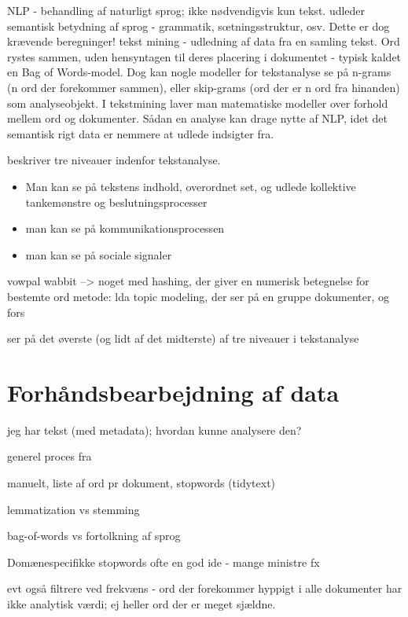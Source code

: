 NLP - behandling af naturligt sprog;  ikke nødvendigvis kun tekst. udleder semantisk betydning af sprog - grammatik, sœtningsstruktur, osv. Dette er dog krævende beregninger!
tekst mining - udledning af data fra en samling tekst. Ord rystes sammen, uden hensyntagen til deres placering i dokumentet - typisk kaldet en Bag of Words-model. Dog kan nogle modeller for tekstanalyse se på n-grams (n ord der forekommer sammen), eller skip-grams (ord der er n ord fra hinanden) som analyseobjekt. 
I tekstmining laver man matematiske modeller over forhold mellem ord og dokumenter.
Sådan en analyse kan drage nytte af NLP, idet det semantisk rigt data er nemmere at udlede indsigter fra.

\citeauthor{evansMachineTranslationMining2016} beskriver tre niveauer indenfor tekstanalyse.
\begin{itemize}
  \item
    Man kan se på tekstens indhold, overordnet set, og udlede kollektive tankemønstre og beslutningsprocesser
  \item
    man kan se på kommunikationsprocessen
  \item
    man kan se på sociale signaler
\end{itemize}

vowpal wabbit --> noget med hashing, der giver en numerisk betegnelse for bestemte ord
metode: lda topic modeling, der ser på en gruppe dokumenter, og fors

ser på det øverste (og lidt af det midterste) af tre niveauer i tekstanalyse \autocite{evansMachineTranslationMining2016}

\section{Forhåndsbearbejdning af data}\label{sec:preproc}

jeg har tekst (med metadata); hvordan kunne analysere den?

generel proces fra \autocite{kwartlerTextMiningPractice2017}

manuelt, liste af ord pr dokument, stopwords (tidytext)

lemmatization vs stemming

bag-of-words vs fortolkning af sprog

Domænespecifikke stopwords ofte en god ide - mange ministre fx

evt også filtrere ved frekvæns - ord der forekommer hyppigt i alle dokumenter har ikke analytisk værdi; ej heller ord der er meget sjældne.

